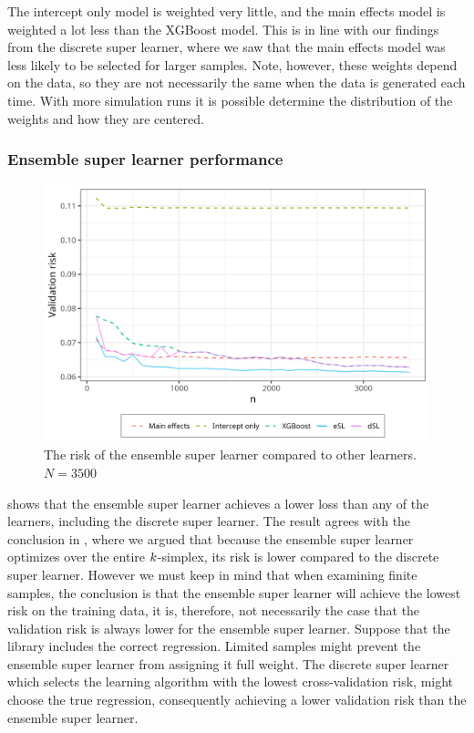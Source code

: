 \documentclass[./main.tex]{subfiles}
\begin{document}
The intercept only model is weighted very little, and the main effects model is weighted a lot less than the XGBoost model. This is in line with our findings from the discrete super learner, where we saw that the main effects model was less likely to be selected for larger samples. Note, however, these weights depend on the data, so they are not necessarily the same when the data is generated each time. With more simulation runs it is possible determine the distribution of the weights and how they are centered. 

\subsubsection{Ensemble super learner performance}
\begin{figure}[H]
    \centering
    \includegraphics[width=\textwidth]{figures/losses_esl_s23.png}
    \caption{The risk of the ensemble super learner compared to other learners. $ N = 3500 $}
    \label{fig:losses_esl_s23}
\end{figure}
 shows that the ensemble super learner achieves a lower loss than any of the learners, including the discrete super learner. The result agrees with the conclusion in , where we argued that because the ensemble super learner optimizes over the entire $ k $-simplex, its risk is lower compared to the discrete super learner. However we must keep in mind that when examining finite samples, the conclusion is that the ensemble super learner will achieve the lowest risk on the training data, it is, therefore, not necessarily the case that the validation risk is always lower for the ensemble super learner. Suppose that the library includes the correct regression. Limited samples might prevent the ensemble super learner from assigning it full weight. The discrete super learner which selects the learning algorithm with the lowest cross-validation risk, might choose the true regression, consequently achieving a lower validation risk than the ensemble super learner.
\end{document}
